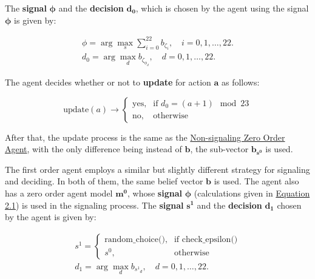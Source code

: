 The \textbf{signal} $\mathbf{\phi}$ and the \textbf{decision} $\mathbf{d_0}$, which is chosen by the agent using the signal $\mathbf{\phi}$ is given by: 

\begin{equation}
\label{eq:zero-order-signal}
\label{eq:zero-order-decide}
\begin{aligned}
    \phi = \arg\max_s \sum_{i=0}^{22} b_{\zeta_i}, \quad i = 0, 1, \ldots, 22. \\
    d_0 = \arg\max_d b_{\zeta_{\phi_d}}, \quad d = 0, 1, \ldots, 22.
\end{aligned}
\end{equation}

The agent decides whether or not to \textbf{update} for action $\mathbf{a}$ as follows: 

\begin{equation}
\text{{update}}(a) \rightarrow \begin{cases}
\text{{yes}}, & \text{{if }} d_0 = (a + 1) \mod 23 \\
\text{{no}}, & \text{{otherwise}}
\end{cases}
\end{equation}

After that, the update process is the same as the \hyperref[eq:zero-order-update]{Non-signaling Zero Order Agent}, with the only difference being instead of $\mathbf{b}$, the sub-vector $\mathbf{b_{s^0}}$ is used.


The first order agent employs a similar but slightly different strategy for signaling and deciding. In both of them, the same belief vector $\mathbf{b}$ is used. The agent also has a zero order agent model $\mathbf{m^0}$, whose \textbf{signal} $\mathbf{\phi}$ (calculations given in \hyperref[eq:zero-order-signal]{Equation 2.1}) is used in the  signaling process. The \textbf{signal} $\mathbf{s^1}$ and the \textbf{decision} $\mathbf{d_1}$ chosen by the agent is given by:

\begin{equation*}
\begin{aligned}
    s^1 = \begin{cases}
        \text{{random\_choice()}}, & \text{{if }} \text{{check\_epsilon()}} \\
        s^0, & \text{{otherwise}}
    \end{cases} \\
    d_1 = \arg\max_d b_{{s^1}_d}, \quad d = 0, 1, \ldots, 22. \qquad
\end{aligned}
\end{equation*}

